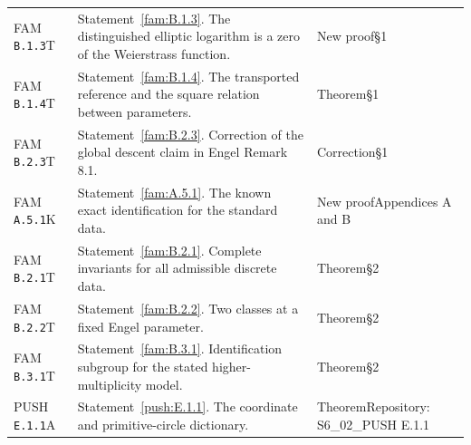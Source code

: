 \documentclass[11pt,a4paper]{article}
\theoremstyle{plain}
\theoremstyle{definition}
\begin{document}
\begin{longtable}{@{}L{.18\linewidth}L{.48\linewidth}L{.29\linewidth}@{}}
FAM \nolinkurl{B.1.3}\newline T & Statement~\ref{fam:B.1.3}. The distinguished elliptic logarithm is a zero of the Weierstrass function.\newline {} & New proof\newline §1\\
FAM \nolinkurl{B.1.4}\newline T & Statement~\ref{fam:B.1.4}. The transported reference and the square relation between parameters.\newline {} & Theorem\newline §1\\
FAM \nolinkurl{B.2.3}\newline T & Statement~\ref{fam:B.2.3}. Correction of the global descent claim in Engel Remark 8.1.\newline {} & Correction\newline §1\\
FAM \nolinkurl{A.5.1}\newline K & Statement~\ref{fam:A.5.1}. The known exact identification for the standard data.\newline {} & New proof\newline Appendices A and B\\
FAM \nolinkurl{B.2.1}\newline T & Statement~\ref{fam:B.2.1}. Complete invariants for all admissible discrete data.\newline {} & Theorem\newline §2\\
FAM \nolinkurl{B.2.2}\newline T & Statement~\ref{fam:B.2.2}. Two classes at a fixed Engel parameter.\newline {} & Theorem\newline §2\\
FAM \nolinkurl{B.3.1}\newline T & Statement~\ref{fam:B.3.1}. Identification subgroup for the stated higher-multiplicity model.\newline {} & Theorem\newline §2\\
PUSH \nolinkurl{E.1.1}\newline A & Statement~\ref{push:E.1.1}. The coordinate and primitive-circle dictionary.\newline {} & Theorem\newline Repository:\allowbreak{} S6\_\allowbreak{}02\_\allowbreak{}PUSH E.1.1\\

\end{longtable}
\end{document}
